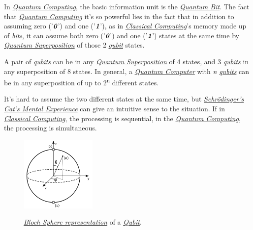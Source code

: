 \documentclass[conference]{IEEEtran}
\begin{document}
\vspace{4pt}

In \href{https://en.wikipedia.org/wiki/Quantum_computing}{\textit{Quantum Computing}}, the basic information unit is the \href{https://en.wikipedia.org/wiki/Qubit}{\textit{Quantum Bit}}. The fact that \href{https://en.wikipedia.org/wiki/Quantum_computing}{\textit{Quantum Computing}} it's so powerful lies in the fact that in addition to assuming zero ('$\textit{\textbf{0}}$') and one ('$\textit{\textbf{1}}$'), as in \href{https://en.wikipedia.org/wiki/Von_Neumann_architecture}{\textit{Classical Computing}}'s memory made up of \href{https://en.wikipedia.org/wiki/Bit}{\textit{bits}}, it can assume both zero ('$\textit{\textbf{0}}$') and one ('$\textit{\textbf{1}}$') states at the same time by \href{https://en.wikipedia.org/wiki/Quantum_superposition}{\textit{Quantum Superposition}} of those 2 \href{https://en.wikipedia.org/wiki/Qubit}{\textit{qubit}} states.

\vspace{4pt}

A pair of \href{https://en.wikipedia.org/wiki/Qubit}{\textit{qubits}} can be in any \href{https://en.wikipedia.org/wiki/Quantum_superposition}{\textit{Quantum Superposition}} of 4 states, and 3 \href{https://en.wikipedia.org/wiki/Qubit}{\textit{qubits}} in any superposition of 8 states. In general, a \href{https://en.wikipedia.org/wiki/Quantum_computing}{\textit{Quantum Computer}} with \textit{n \href{https://en.wikipedia.org/wiki/Qubit}{qubits}} can be in any superposition of up to 2\textsuperscript{n} different states.

\vspace{4pt}

It's hard to assume the two different states at the same time, but \href{https://en.wikipedia.org/wiki/Schr\%C3\%B6dinger\%27s_cat}{\textit{Schr\"odinger's Cat's Mental Experience}} can give an intuitive sense to the situation. If in \href{https://en.wikipedia.org/wiki/Von_Neumann_architecture}{\textit{Classical Computing}}, the processing is sequential, in the \href{https://en.wikipedia.org/wiki/Quantum_computing}{\textit{Quantum Computing}}, the processing is simultaneous.

\vspace{4pt}

\begin{figure}[htbp]
\centerline{\href{https://en.wikipedia.org/wiki/Qubit}{\includegraphics{imgs/fig-4.png}}}
\caption{\href{https://en.wikipedia.org/wiki/Bloch_sphere}{\textit{Bloch Sphere representation}} of a \href{https://en.wikipedia.org/wiki/Qubit}{\textit{Qubit}}.}
\label{fig}
\end{figure}
\end{document}
